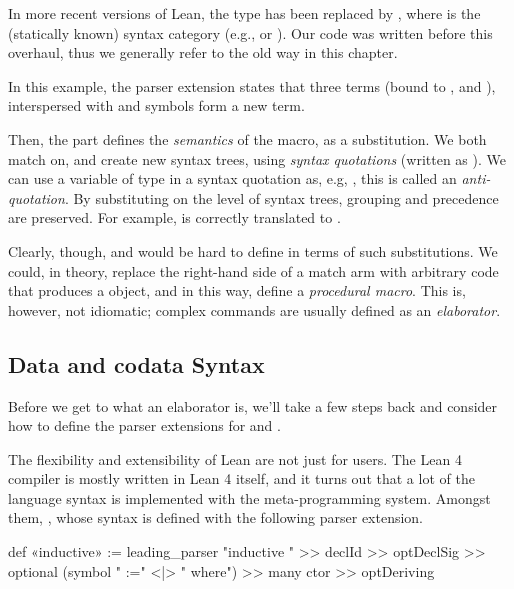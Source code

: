 \begin{remark}
    In more recent versions of Lean, the  type has been replaced by , where  is the (statically known) syntax category (e.g.,  or ).
    Our code was written before this overhaul, thus we generally refer to the old way in this chapter.
\end{remark}


In this example, the parser extension states that three terms (bound to ,  and ), interspersed with  and \lean{:} symbols form a new term.

Then, the 
part defines the \emph{semantics} of the macro, as a substitution. We both match on, and create new syntax trees, using \emph{syntax quotations} (written as ). We can use a variable of type  in a syntax quotation as, e.g, , this is called an \emph{anti-quotation}. By substituting on the level of syntax trees, grouping and precedence are preserved. For example,  is correctly translated
to .

Clearly, though, \data{} and \codata{} would be hard to define in terms of such substitutions.
We could, in theory, replace the right-hand side of a  match arm 
with arbitrary code that produces a  object, and in this way, define a \emph{procedural macro}.
This is, however, not idiomatic; complex commands are usually defined as an \emph{elaborator}.


\subsection*{Data and codata Syntax}%
\label{subsec:impl:syntax}

Before we get to what an elaborator is, we'll take a few steps back and consider how to define the parser extensions for \data{} and \codata{}.

The flexibility and extensibility of Lean are not just for users. The Lean 4 compiler is mostly written in Lean 4 itself, and it turns out that a lot of the language syntax is implemented with the meta-programming system. Amongst them, \inductive{},
whose syntax is defined with the following parser extension.
\begin{leancode}
  def «inductive» := leading_parser "inductive " >> declId >> optDeclSig 
                      >> optional (symbol " :=" <|> " where") 
                      >> many ctor 
                      >> optDeriving
\end{leancode}

